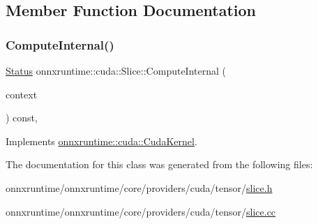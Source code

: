 \subsection{Member Function Documentation}
\mbox{\label{classonnxruntime_1_1cuda_1_1Slice_a2726a33736da2c094d5f7eec39f86abc}} 
\subsubsection{\texorpdfstring{Compute\+Internal()}{ComputeInternal()}}
{\footnotesize\ttfamily \mbox{\hyperlink{classonnxruntime_1_1common_1_1Status}{Status}} onnxruntime\+::cuda\+::\+Slice\+::\+Compute\+Internal (\begin{DoxyParamCaption}\item[{\mbox{\hyperlink{classonnxruntime_1_1OpKernelContext}{Op\+Kernel\+Context}} $\ast$}]{context }\end{DoxyParamCaption}) const\hspace{0.3cm}{\ttfamily [override]}, {\ttfamily [virtual]}}



Implements \mbox{\hyperlink{classonnxruntime_1_1cuda_1_1CudaKernel_aca7af04ae448017d6023d30bba231ebb}{onnxruntime\+::cuda\+::\+Cuda\+Kernel}}.



The documentation for this class was generated from the following files\+:\begin{DoxyCompactItemize}
\item 
onnxruntime/onnxruntime/core/providers/cuda/tensor/\mbox{\hyperlink{cuda_2tensor_2slice_8h}{slice.\+h}}\item 
onnxruntime/onnxruntime/core/providers/cuda/tensor/\mbox{\hyperlink{cuda_2tensor_2slice_8cc}{slice.\+cc}}\end{DoxyCompactItemize}
